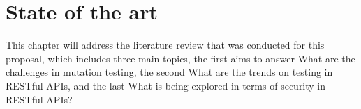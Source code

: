 \chapter{State of the art}

This chapter will address the literature review that was conducted for this proposal, which includes three main topics, the first aims to answer What are the challenges in mutation testing, the second What are the trends on testing in RESTful APIs, and the last What is being explored in terms of security in RESTful APIs?